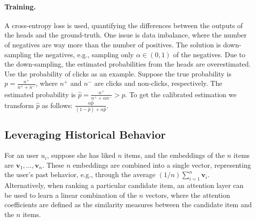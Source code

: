         \paragraph{Training.}
        A cross-entropy loss is used, quantifying the differences between the outputs of the heads and the ground-truth.
        One issue is data imbalance, where the number of negatives are way more than the number of positives. 
        The solution is down-sampling the negatives, e.g., sampling only $\alpha \in (0, 1)$ of the negatives. 
        Due to the down-sampling, the estimated probabilities from the heads are overestimated. 
        Use the probability of clicks as an example. 
        Suppose the true probability is $p = \frac{n^+}{n^+ + n^-}$, where $n^+$ and $n^-$ are clicks and non-clicks, respectively. 
        The estimated probability is $\hat{p} = \frac{n^+}{n^+ + \alpha n^-} > p$.
        To get the calibrated estimation we transform $\hat{p}$ as follows: $\frac{\alpha \hat{p}}{(1 - \hat{p}) + \alpha \hat{p}}$.
        
    

    \subsection{Leveraging Historical Behavior}
        For an user $u_i$, suppose she has liked $n$ items, and the embeddings of the $n$ items are $\bm{v}_1, \ldots, \bm{v}_n$.
        These $n$ embeddings are combined into a single vector, representing the user's past behavior, e.g., through the average $(1/n)\sum_{i=1}^{n}{\bm{v}_i}$.
        Alternatively, when ranking a particular candidate item, an attention layer can be used to learn a linear combination of the $n$ vectors, where the attention coefficients are defined as the similarity measures between the candidate item and the $n$ items. 